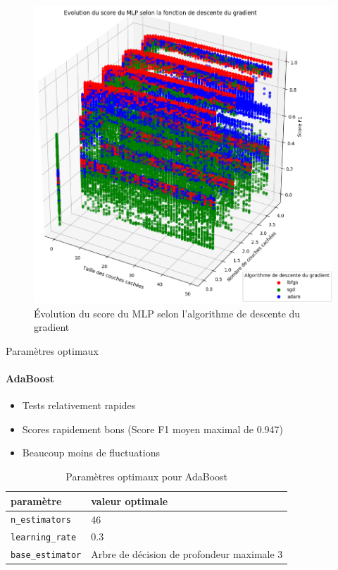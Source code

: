 \documentclass[usenames,dvipsnames]{beamer}
\begin{document}
\begin{frame}
\begin{figure}
\centering
\includegraphics[width=.56\textwidth]{img/mlp_solver_crop.png}
\caption{Évolution du score du MLP selon l'algorithme de descente du gradient}
\end{figure}
\end{frame}

\begin{frame}{Paramètres optimaux}
\framesubtitle{AdaBoost}

\begin{itemize}
\item Tests relativement rapides
\item Scores rapidement bons (Score F1 moyen maximal de 0.947)
\item Beaucoup moins de fluctuations
\end{itemize}

\begin{table}
\centering
\begin{tabular}{l l}
paramètre & valeur optimale \\
\hline
\texttt{n\_estimators} & 46\\
\texttt{learning\_rate} & 0.3 \\
\texttt{base\_estimator} & Arbre de décision de profondeur maximale 3\\
\end{tabular}
\caption{Paramètres optimaux pour AdaBoost}
\end{table}

\end{frame}
\end{document}
